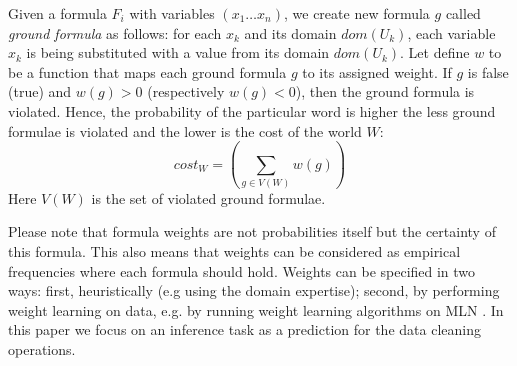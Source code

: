 Given a formula $F_i$ with variables $(x_1 \dots x_n)$, we create new formula $g$ called \textit{ground formula} as follows: for each $x_k$ and its domain $dom(U_k)$, each variable $x_k$ is being substituted with a value from its domain $dom(U_k)$.
Let define $w$ to be a function that maps each ground formula $g$ to its assigned weight. If $g$ is false (true) and $w(g)>0$ (respectively $w(g)<0$), then the ground formula is violated. Hence, the probability of the particular word is higher the less ground formulae is violated and the lower is the cost of the world $W$: 
\begin{equation*}
cost_W = \left( \sum_{g \in V(W)} w(g) \right)
\end{equation*} 
Here $V(W)$ is the set of violated ground formulae.

Please note that formula weights are not probabilities itself but the certainty of this formula. This also means that weights 
can be considered as empirical frequencies where each formula should hold. Weights can be specified in two ways: first, heuristically (e.g using the domain expertise); second, by performing weight learning on data, e.g. by running weight learning algorithms on MLN \cite{lowd2007efficient}. In this paper we focus on an inference task as a prediction for the data cleaning operations.

